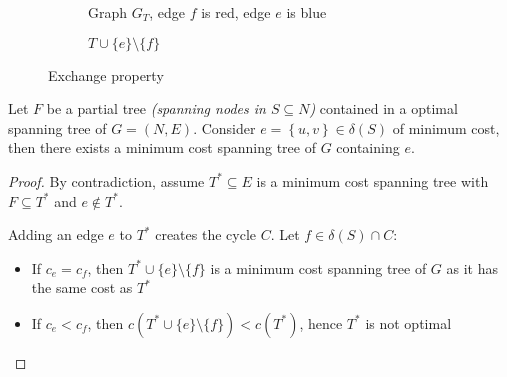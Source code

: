 \documentclass[english]{article}
\begin{document}
\begin{figure}[htbp]
  \centering
  \bigskip
  \begin{subfigure}[t]{0.495\textwidth}
    \centering
    \caption{Graph \(G_T\), edge \(f\) is red, edge \(e\) is blue}
  \end{subfigure}
  \begin{subfigure}[t]{0.495\textwidth}
    \centering
    \caption{\(T \cup \{e\} \setminus \{f\}\)}
  \end{subfigure}
  \caption{Exchange property}
  \label{fig:exchange-property}
  \bigskip
\end{figure}

\begin{property}
  Let \(F\) be a partial tree \textit{(spanning nodes in \(S \subseteq N\))} contained in a optimal spanning tree of \(G = (N, E)\).
  Consider \(e = \left\{u, v\right\} \in \delta(S)\) of minimum cost, then there exists a minimum cost spanning tree of \(G\) containing \(e\).
\end{property}

\begin{proof}
  By contradiction, assume \(T^\ast \subseteq E\) is a minimum cost spanning tree with \(F \subseteq T^\ast\) and \(e \notin T^\ast\).

  Adding an edge \(e\) to \(T^\ast\) creates the cycle \(C\).
  Let \(f \in \delta(S) \cap C\):

  \begin{itemize}
    \item If \(c_e = c_f\), then \(T^\ast \cup \{e\}\setminus \{f\}\) is a minimum cost spanning tree of \(G\) as it has the same cost as \(T^\ast\)
    \item If \(c_e < c_f\), then \(c \left( T^\ast \cup \{e\} \setminus \{f\} \right) < c \left(T^\ast\right)\), hence \(T^\ast\) is not optimal
  \end{itemize}

\end{proof}
\end{document}
